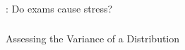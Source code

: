 \begin{frame}
  \begin{block}{\examplectd: Do exams cause stress?}
  \begin{center}
  \end{center}
  \end{block}
\end{frame}

\begin{frame}
\frametitle{}
  
  \begin{center}
    \Large{Assessing the Variance of a Distribution}
  \end{center}
\end{frame}

